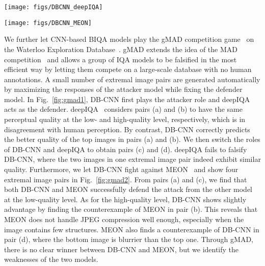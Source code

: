 \documentclass[journal]{IEEEtran}
\begin{document}
\begin{figure*}
  \centering
  \texttt{[image: figs/DBCNN\_deepIQA]}
  \caption{gMAD competition results between DB-CNN and deepIQA~\cite{bosse2016deep}. (a) Fixed deepIQA at the low-quality level. (b) Fixed deepIQA at the high-quality level. (c) Fixed DB-CNN at the low-quality level. (d) Fixed DB-CNN at the high-quality level.}\label{fig:gmad1}
\end{figure*}

\begin{figure*}
  \centering
  \texttt{[image: figs/DBCNN\_MEON]}
  \caption{gMAD competition results between DB-CNN and MEON~\cite{Ma2018End}. (a) Fixed MEON at the low-quality level. (b) Fixed MEON at the high-quality level. (c) Fixed DB-CNN at the low-quality level. (d) Fixed DB-CNN at the high-quality level.}\label{fig:gmad2}
\end{figure*}

We further let CNN-based BIQA models play the gMAD competition game~\cite{ma2016group} on the Waterloo Exploration Database~\cite{ma2017waterloo}.
gMAD extends the idea of the MAD competition~\cite{wang2008maximum} and allows a group of IQA models to be falsified in the most efficient way by letting them compete on a large-scale database with no human annotations. A small number of extremal image pairs are  generated automatically by maximizing the responses of the attacker model while fixing the defender model. In Fig.~\ref{fig:gmad1}, DB-CNN first plays the attacker role and deepIQA~\cite{bosse2016deep} acts as the defender. deepIQA~\cite{bosse2016deep} considers pairs (a) and (b) to have the same perceptual quality at the low- and high-quality level, respectively, which is in disagreement with human perception. By contrast, DB-CNN correctly predicts the better quality of  the top images in pairs (a) and (b). We then switch the roles of DB-CNN and deepIQA to obtain pairs (c) and (d). deepIQA fails to falsify DB-CNN, where the two images in one extremal image pair indeed exhibit similar quality. Furthermore, we let DB-CNN fight against MEON~\cite{Ma2018End} and show four extremal image pairs in Fig.~\ref{fig:gmad2}. From pairs (a) and (c), we find that  both DB-CNN and MEON successfully defend the attack from the other model at the low-quality level.
 As for the high-quality level, DB-CNN shows slightly advantage by finding the counterexample of MEON in pair (b). This reveals that MEON does not handle JPEG compression well enough, especially when the image contains few structures. MEON also finds a counterexample of DB-CNN in pair (d), where the bottom image is blurrier than the top one. Through gMAD, there is no clear winner between DB-CNN and MEON, but we identify the weaknesses of the two models.
\end{document}
